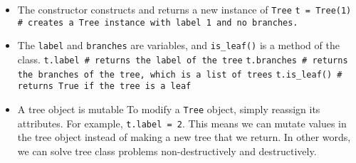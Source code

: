 \vspace{2mm}
\begin{itemize}
\item The constructor constructs and returns a new instance of \lstinline{Tree}
    \subitem \lstinline{t = Tree(1) # creates a Tree instance with label 1 and no branches.}
\item The \lstinline{label} and \lstinline{branches} are variables, and \lstinline{is_leaf()} is a method of the class.
    \subitem \lstinline{t.label # returns the label of the tree}
    \subitem \lstinline{t.branches # returns the branches of the tree, which is a list of trees}
    \subitem \lstinline{t.is_leaf() # returns True if the tree is a leaf}
\item A tree object is mutable
    \subitem To modify a \lstinline{Tree} object, simply reassign its attributes. For example, \lstinline{t.label = 2}.
    \subitem This means we can mutate values in the tree object instead of making a new tree that we return. In other words, we can solve tree class problems non-destructively and destructively.
\end{itemize}